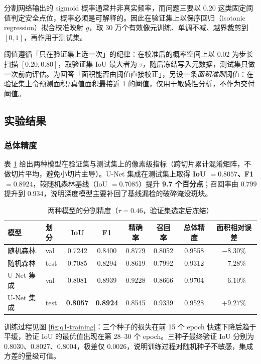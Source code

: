 分割网络输出的 sigmoid 概率通常并非真实频率\cite{guo2017calibration}，而问题三要以 $0.20$ 这类固定阈值判定安全点位，概率必须是可解释的。因此在验证集上以保序回归（isotonic regression）\cite{zadrozny2002isotonic}拟合校准映射 $g$，取 30 万个有效像元训练、单调不减、越界裁剪到 $[0,1]$，再作用于测试集。

阈值遵循「只在验证集上选一次」的纪律：在校准后的概率空间上以 $0.02$ 为步长扫描 $[0.20,0.80]$，取验证集 IoU 最大者为 $\tau$，随后冻结写入元数据，测试集只做一次前向评估。为回答「面积能否由阈值直接校正」，另设一条\emph{面积准则}阈值：在验证集上令预测面积/真值面积最接近 1 的阈值，仅用于敏感性分析，不作为交付阈值。

\subsection{实验结果}
\label{sec:q1-result}

\subsubsection{总体精度}

表 \ref{tab:q1-models} 给出两种模型在验证集与测试集上的像素级指标（跨切片累计混淆矩阵，不做切片平均，避免小切片主导）。U-Net 集成在测试集上取得 \textbf{IoU $=0.8057$、F1 $=0.8924$}，较随机森林基线（IoU $=0.7085$）提升 \textbf{9.7 个百分点}；召回率由 $0.799$ 提升到 $0.934$，说明深度模型主要补回了基线漏检的破碎淹没斑块。

\begin{table}[H]
\centering
\caption{两种模型的分割精度（$\tau=0.46$，验证集选定后冻结）}
\label{tab:q1-models}
\begin{tabular}{llcccccc}
\toprule
模型 & 划分 & IoU & F1 & 精确率 & 召回率 & 总体精度 & 面积相对误差 \\
\midrule
随机森林 & val  & 0.7242 & 0.8400 & 0.8779 & 0.8052 & 0.9558 & $-8.30\%$ \\
随机森林 & test & 0.7085 & 0.8294 & 0.8619 & 0.7992 & 0.9312 & $-7.28\%$ \\
U-Net 集成 & val  & 0.8081 & 0.8939 & 0.9228 & 0.8666 & 0.9704 & $-6.10\%$ \\
U-Net 集成 & test & \textbf{0.8057} & \textbf{0.8924} & 0.8545 & 0.9339 & 0.9528 & $+9.27\%$ \\
\bottomrule
\end{tabular}
\end{table}

训练过程见图 \ref{fig:q1-training}：三个种子的损失在前 15 个 epoch 快速下降后趋于平缓，验证 IoU 的最优值出现在第 28--30 个 epoch。三种子最终验证 IoU 分别为 $0.8030$、$0.8027$、$0.8004$，极差仅 $0.0026$，说明训练过程对随机种子不敏感，集成方差的量级可信。

